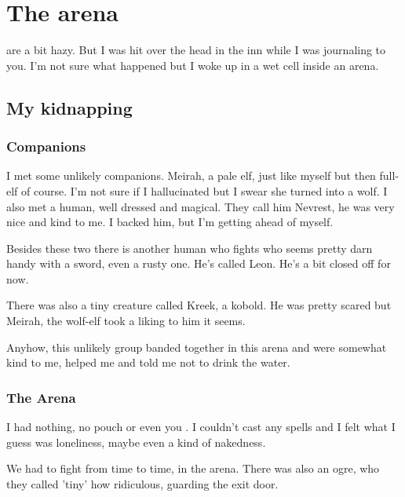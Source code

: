 
\chapter{The arena}
\label{diary__arena}

 are a bit hazy. But I was hit over the head in the inn while I was journaling to you. I'm not sure what happened but I woke up in a wet cell inside an arena.

\section{My kidnapping}

\subsection*{Companions}

I met some unlikely companions. Meirah, a pale elf, just like myself but then full-elf of course. I'm not sure if I hallucinated but I swear she turned into a wolf. I also met a human, well dressed and magical. They call him Nevrest, he was very nice and kind to me. I backed him, but I'm getting ahead of myself.

Besides these two there is another human who fights who seems pretty darn handy with a sword, even a rusty one. He's called Leon. He's a bit closed off for now.

There was also a tiny creature called Kreek, a kobold. He was pretty scared but Meirah, the wolf-elf took a liking to him it seems.

Anyhow, this unlikely group banded together in this arena and were somewhat kind to me, helped me and told me not to drink the water.

\subsection*{The Arena}
I had nothing, no pouch or even you \Master{}. I couldn't cast any spells and I felt what I guess was loneliness, maybe even a kind of nakedness.

We had to fight from time to time, in the arena. There was also an ogre, who they called 'tiny' how ridiculous, guarding the exit door.

